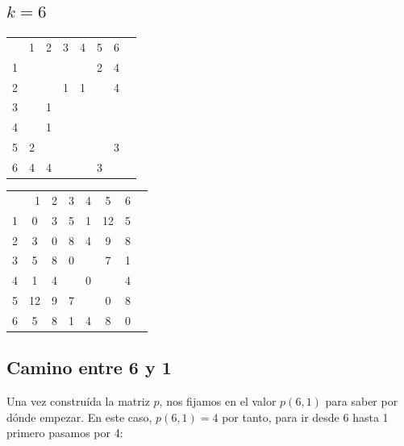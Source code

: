 \documentclass[10pt,a4paper,spanish]{report}
\theoremstyle{definition}
\theoremstyle{remark}
\begin{document}
\subsection{$k=6$}
\begin{minipage}{0.5\textwidth}
\begin{center}
\begin{tabular}{c|c|c|c|c|c|c|c|}
\multicolumn{2}{r}{1} & \multicolumn{1}{c}{2} & \multicolumn{1}{c}{3} & \multicolumn{1}{c}{4} & \multicolumn{1}{c}{5} & \multicolumn{1}{c}{6} \\ 
\cline{2-7}
1 & & & & & 2 & 4 \\
\cline{2-7} 
2 & & & 1 & 1 & & 4 \\
\cline{2-7} 
3 & & 1 & & \cellcolor{Black}{\textcolor{White}{6}} & & \\
\cline{2-7} 
4 & & 1 & \cellcolor{Black}{\textcolor{White}{6}} & & \cellcolor{Black}{\textcolor{White}{6}} & \\
\cline{2-7} 
5 & 2 & & & \cellcolor{Black}{\textcolor{White}{6}} & & 3 \\
\cline{2-7} 
6 & 4 & 4 & & & 3 & \\
\cline{2-7} 
\end{tabular}
\end{center}
\end{minipage}
\begin{minipage}{0.5\textwidth}
\begin{center}
\begin{tabular}{c|c|c|c|c|c|c|c|}
\multicolumn{2}{r}{1} & \multicolumn{1}{c}{2} & \multicolumn{1}{c}{3} & \multicolumn{1}{c}{4} & \multicolumn{1}{c}{5} & \multicolumn{1}{c}{6} \\ 
\cline{2-7}
1 & 0 & 3 & 5 & 1 & 12 & 5 \\
\cline{2-7} 
2 & 3 & 0 & 8 & 4 & 9 & 8 \\
\cline{2-7} 
3 & 5 & 8 & 0 & \cellcolor{Black}{\textcolor{White}{4}} & 7 & 1 \\
\cline{2-7} 
4 & 1 & 4 & \cellcolor{Black}{\textcolor{White}{5}} & 0 & \cellcolor{Black}{\textcolor{White}{12}} & 4 \\
\cline{2-7} 
5 & 12 & 9 & 7 & \cellcolor{Black}{\textcolor{White}{12}} & 0 &  8 \\
\cline{2-7} 
6 & 5 & 8 & 1 & 4 & 8 & 0 \\
\cline{2-7} 
\end{tabular}
\end{center}
\end{minipage}

\subsection{Camino entre 6 y 1}
Una vez construída la matriz $p$, nos fijamos en el valor $p(6,1)$ para saber por dónde empezar. En este caso, $p(6,1) = 4$ por tanto, para ir desde 6 hasta 1 primero pasamos por 4:
\end{document}
